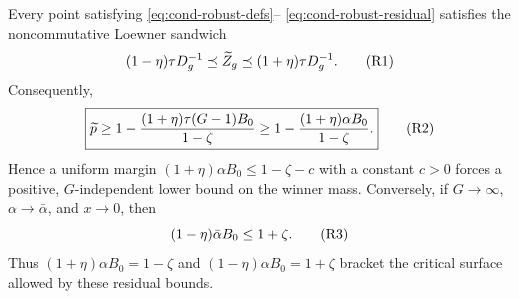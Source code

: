 \begin{theorem}
\label{thm:cond-robust}
Every point satisfying \eqref{eq:cond-robust-defs}--
\eqref{eq:cond-robust-residual} satisfies the noncommutative Loewner
sandwich
\begin{equation*}
 (1-\eta)\tau D_g^{-1}\preceq\widetilde Z_g
 \preceq(1+\eta)\tau D_g^{-1}.                            \condtag{R1}\label{eq:cond-r3}
\end{equation*}
Consequently,
\begin{equation*}
 \boxed{\widetilde p\ge
 1-\frac{(1+\eta)\tau(G-1)B_0}{1-\zeta}
 \ge1-\frac{(1+\eta)\alpha B_0}{1-\zeta}.}               \condtag{R2}\label{eq:cond-r4}
\end{equation*}
Hence a uniform margin $(1+\eta)\alpha B_0\le1-\zeta-c$ with a constant
$c>0$ forces a positive, $G$-independent lower bound on the winner mass.  Conversely, if $G\to\infty$,
$\alpha\to\bar\alpha$, and $x\to0$, then
\begin{equation*}
 (1-\eta)\bar\alpha B_0\le1+\zeta.                       \condtag{R3}\label{eq:cond-r5}
\end{equation*}
Thus $(1+\eta)\alpha B_0=1-\zeta$ and
$(1-\eta)\alpha B_0=1+\zeta$ bracket the critical surface allowed by these
residual bounds.


\end{theorem}
